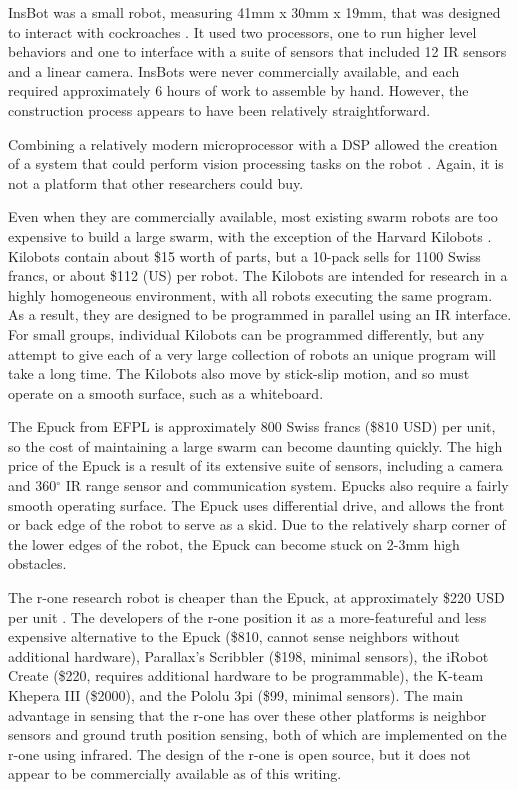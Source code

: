 \documentclass[]{article}
\begin{document}
InsBot was a small robot, measuring 41mm x 30mm x 19mm, that was designed to interact with cockroaches \cite{colot2004insbot}.
It used two processors, one to run higher level behaviors and one to interface with a suite of sensors that included 12 IR sensors and a linear camera. 
InsBots were never commercially available, and each required approximately 6 hours of work to assemble by hand. 
However, the construction process appears to have been relatively straightforward. 

Combining a relatively modern microprocessor with a DSP allowed the creation of a system that could perform vision processing tasks on the robot \cite{haverinen2005miniature}. 
Again, it is not a platform that other researchers could buy.

Even when they are commercially available, most existing swarm robots are too expensive to build a large swarm, with the exception of the Harvard Kilobots  \cite{rubenstein2014kilobot}. 
Kilobots contain about \$15 worth of parts, but a 10-pack sells for 1100 Swiss francs, or about \$112 (US) per robot. 
The Kilobots are intended for research in a highly homogeneous environment, with all robots executing the same program. 
As a result, they are designed to be programmed in parallel using an IR interface. 
For small groups, individual Kilobots can be programmed differently, but any attempt to give each of a very large collection of robots an unique program will take a long time. 
The Kilobots also move by stick-slip motion, and so must operate on a smooth surface, such as a whiteboard. 

The Epuck from EFPL is approximately 800 Swiss francs (\$810 USD) per unit, so the cost of maintaining a large swarm can become daunting quickly. 
The high price of the Epuck is a result of its extensive suite of sensors, including a camera and 360$^{\circ}$ IR range sensor and communication system. 
Epucks also require a fairly smooth operating surface.
The Epuck uses differential drive, and allows the front or back edge of the robot to serve as a skid. 
Due to the relatively sharp corner of the lower edges of the robot, the Epuck can become stuck on 2-3mm high obstacles. 

The r-one research robot is cheaper than the Epuck, at approximately \$220 USD per unit \cite{mclurkin2013low}. 
The developers of the r-one position it as a more-featureful and less expensive alternative to the Epuck (\$810, cannot sense neighbors without additional hardware), Parallax's Scribbler (\$198, minimal sensors), the iRobot Create (\$220, requires additional hardware to be programmable), the K-team Khepera III (\$2000), and the Pololu 3pi (\$99, minimal sensors). The main advantage in sensing that the r-one has over these other platforms is neighbor sensors and ground truth position sensing, both of which are implemented on the r-one using infrared.
The design of the r-one is open source, but it does not appear to be commercially available as of this writing.   
\end{document}

